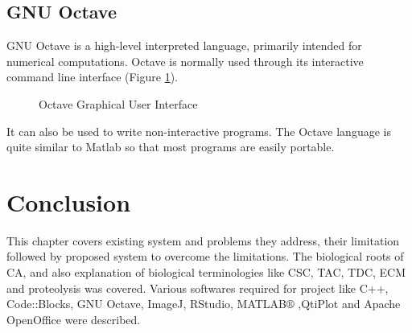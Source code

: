 \subsection{GNU Octave}
GNU Octave is a high-level interpreted language, primarily intended for numerical computations. 
Octave is normally used through its interactive command line interface (Figure \ref{OctaveGui}).
\begin{figure}[H]
	\centering
	\caption{Octave Graphical User Interface}
	\label{OctaveGui}
\end{figure}
\noindent It can also be used to write non-interactive programs. 
The Octave language is quite similar to Matlab so that most programs are easily portable.

\section{Conclusion}
This chapter covers existing system and problems they address, their limitation followed by proposed system to overcome the limitations.
The biological roots of CA, and also explanation of biological terminologies like CSC, TAC, TDC, ECM and proteolysis was covered.
Various softwares required for project like C++, Code::Blocks, GNU Octave, ImageJ, RStudio, MATLAB$\circledR$ ,QtiPlot and Apache OpenOffice were described.

